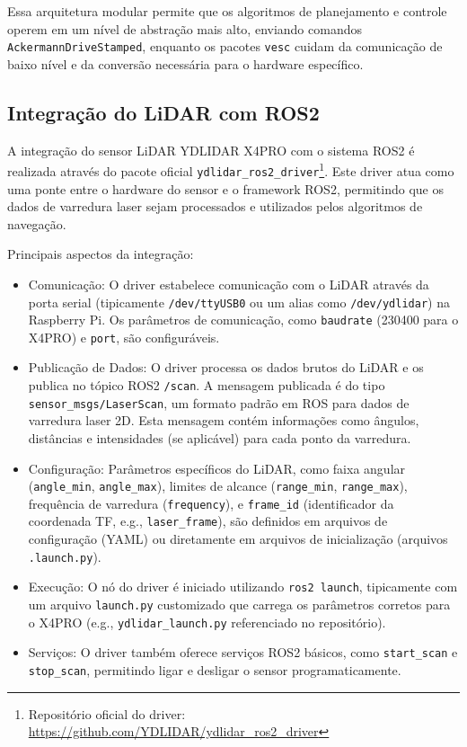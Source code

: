 Essa arquitetura modular permite que os algoritmos de planejamento e controle
operem em um nível de abstração mais alto, enviando comandos
\texttt{AckermannDriveStamped}, enquanto os pacotes \texttt{vesc} cuidam da
comunicação de baixo nível e da conversão necessária para o hardware
específico.

\subsection{Integração do LiDAR com ROS2}

A integração do sensor LiDAR YDLIDAR X4PRO com o sistema ROS2 é realizada
através do pacote oficial \texttt{ydlidar\_ros2\_driver}\footnote{Repositório
      oficial do driver:
      \url{https://github.com/YDLIDAR/ydlidar_ros2_driver}}\cite{YDLIDARDriver}. Este
driver atua como uma ponte entre o hardware do sensor e o framework ROS2,
permitindo que os dados de varredura laser sejam processados e utilizados pelos
algoritmos de navegação.

Principais aspectos da integração:
\begin{itemize}
      \item Comunicação: O driver estabelece comunicação com o LiDAR através da porta
            serial (tipicamente \texttt{/dev/ttyUSB0} ou um alias como
            \texttt{/dev/ydlidar}) na Raspberry Pi. Os parâmetros de comunicação, como
            \texttt{baudrate} (230400 para o X4PRO) e \texttt{port}, são configuráveis.
      \item Publicação de Dados: O driver processa os dados brutos do LiDAR e os publica no
            tópico ROS2 \texttt{/scan}. A mensagem publicada é do tipo
            \texttt{sensor\_msgs/LaserScan}, um formato padrão em ROS para dados de
            varredura laser 2D. Esta mensagem contém informações como ângulos, distâncias e
            intensidades (se aplicável) para cada ponto da varredura.
      \item Configuração: Parâmetros específicos do LiDAR, como faixa angular
            (\texttt{angle\_min}, \texttt{angle\_max}), limites de alcance
            (\texttt{range\_min}, \texttt{range\_max}), frequência de varredura
            (\texttt{frequency}), e \texttt{frame\_id} (identificador da coordenada TF,
            e.g., \texttt{laser\_frame}), são definidos em arquivos de configuração (YAML)
            ou diretamente em arquivos de inicialização (arquivos \texttt{.launch.py}).
      \item Execução: O nó do driver é iniciado utilizando \texttt{ros2 launch},
            tipicamente com um arquivo \texttt{launch.py} customizado que carrega os
            parâmetros corretos para o X4PRO (e.g., \texttt{ydlidar\_launch.py}
            referenciado no repositório).
      \item Serviços: O driver também oferece serviços ROS2 básicos, como
            \texttt{start\_scan} e \texttt{stop\_scan}, permitindo ligar e desligar o
            sensor programaticamente.
\end{itemize}

